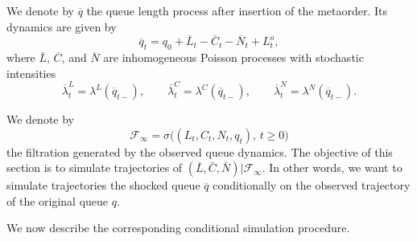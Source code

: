 \documentclass{article} %
\def\wb{\overline}
\newcommand{\1}{\mathbbm{1}} %
\begin{document}
We denote by $\wb q$ the queue length process after insertion of the metaorder. Its dynamics are given by
\begin{equation}
\label{eq:bar_queue}
\wb q_t = q_0 + \wb L_t - \wb C_t - \wb N_t + L^o_t ,
\end{equation}
where $\wb L$, $\wb C$, and $\wb N$ are inhomogeneous Poisson processes with stochastic intensities
\begin{equation}
\wb \lambda_t^{L} = \lambda^L(\wb q_{t-}),
\qquad
\wb \lambda_t^{C} = \lambda^C(\wb q_{t-}), \qquad \wb \lambda_t^{N} = \lambda^N(\wb q_{t-}).
\end{equation}

We denote by
\[
\mathcal F_\infty = \sigma\bigl( (L_t, C_t, N_t, q_t),\, t \ge 0 \bigr)
\]
the filtration generated by the observed queue dynamics.
The objective of this section is to simulate trajectories of $(\bar{L}, \bar{C}, \bar{N}) | \mathcal{F}_\infty$. In other words, we want to simulate trajectories the shocked queue $\wb q$ conditionally on the observed trajectory of the original queue $q$.

We now describe the corresponding conditional simulation procedure.
\end{document}
